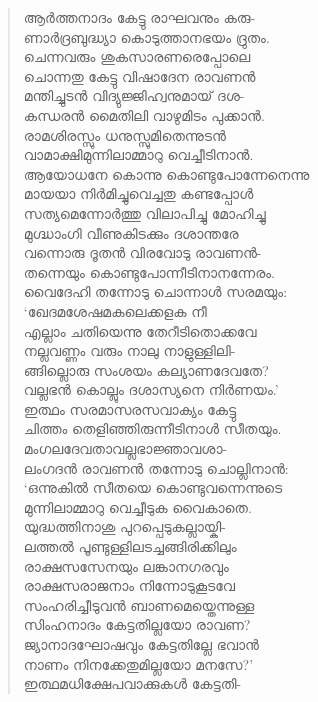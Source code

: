 \begin{verse}
ആര്‍ത്തനാദം കേട്ടു രാഘവനും കരു-\\
ണാര്‍ദ്രബുദ്ധ്യാ കൊടുത്താനഭയം ദ്രുതം.\\
ചെന്നവരും ശുകസാരണരെപ്പോലെ\\
ചൊന്നതു കേട്ടു വിഷാദേന രാവണന്‍\\
മന്തിച്ചുടന്‍ വിദ്യുജ്ജിഹ്വനുമായ് ദശ-\\
കന്ധരന്‍ മൈതിലി വാഴുമിടം പുക്കാന്‍.\\
രാമശിരസ്സും ധനുസ്സുമിതെന്നുടന്‍\\
വാമാക്ഷിമുന്നിലാമ്മാറു വെച്ചീടിനാന്‍.\\
ആയോധനേ കൊന്നു കൊണ്ടുപോന്നേനെന്നു\\
മായയാ നിര്‍മിച്ചുവെച്ചതു കണ്ടപ്പോള്‍\\
സത്യമെന്നോര്‍ത്തു വിലാപിച്ചു മോഹിച്ചു\\
മുഗ്ദ്ധാംഗി വീണുകിടക്കും ദശാന്തരേ\\
വന്നൊരു ദൂതന്‍ വിരവോടു രാവണന്‍-\\
തന്നെയും കൊണ്ടുപോന്നീടിനാനന്നേരം.\\
വൈദേഹി തന്നോടു ചൊന്നാള്‍ സരമയും:\\
‘ഖേദമശേഷമകലെക്കളക നീ\\
എല്ലാം ചതിയെന്നു തേറീടിതൊക്കവേ\\
നല്ലവണ്ണം വരും നാലു നാളുള്ളിലി-\\
ങ്ങില്ലൊരു സംശയം കല്യാണദേവതേ?\\
വല്ലഭന്‍ കൊല്ലും ദശാസ്യനെ നിര്‍ണയം.’\\
ഇത്ഥം സരമാസരസവാക്യം കേട്ടു\\
ചിത്തം തെളിഞ്ഞിരുന്നീടിനാള്‍ സീതയും.\\
മംഗലദേവതാവല്ലഭാജ്ഞാവശാ-\\
ലംഗദന്‍ രാവണന്‍ തന്നോടു ചൊല്ലിനാന്‍:\\
‘ഒന്നുകില്‍ സീതയെ കൊണ്ടുവന്നെന്നുടെ\\
മുന്നിലാമ്മാറു വെച്ചീടുക വൈകാതെ.\\
യുദ്ധത്തിനാശു പുറപ്പെടുകല്ലായ്കി-\\
ലത്തല്‍ പൂണ്ടുള്ളിലടച്ചങ്ങിരിക്കിലും\\
രാക്ഷസസേനയും ലങ്കാനഗരവും\\
രാക്ഷസരാജനാം നിന്നോടുകൂടവേ\\
സംഹരിച്ചീടുവന്‍ ബാണമെയ്തെന്നുള്ള\\
സിംഹനാദം കേട്ടതില്ലയോ രാവണ?\\
ജ്യാനാദഘോഷവും കേട്ടതില്ലേ ഭവാന്‍\\
നാണം നിനക്കേതുമില്ലയോ മനസേ?’\\
ഇത്ഥമധിക്ഷേപവാക്കുകള്‍ കേട്ടതി-\\

\end{verse}
